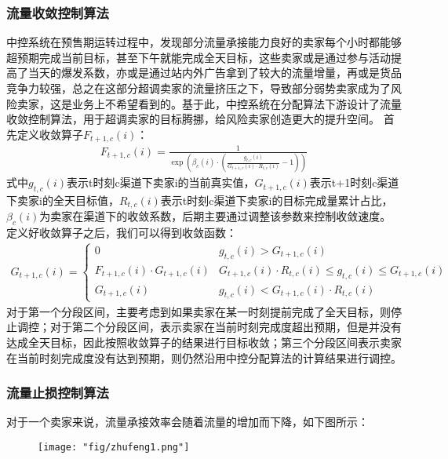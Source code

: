 \subsubsection{流量收敛控制算法}
中控系统在预售期运转过程中，发现部分流量承接能力良好的卖家每个小时都能够超预期完成当前目标，甚至下午就能完成全天目标，这些卖家或是通过参与活动提高了当天的爆发系数，亦或是通过站内外广告拿到了较大的流量增量，再或是货品竞争力较强，总之在这部分超调卖家的流量挤压之下，导致部分弱势卖家成为了风险卖家，这是业务上不希望看到的。基于此，中控系统在分配算法下游设计了流量收敛控制算法，用于超调卖家的目标腾挪，给风险卖家创造更大的提升空间。
首先定义收敛算子$F_{t+1,c}(i)$：
\begin{align}
F_{t+1,c}(i) = \frac{1}{\exp\left(\beta_c(i) \cdot (\frac{g_{t,c}(i)}{G_{t+1,c}(i) \cdot R_{t,c}(i)} - 1)\right )}
\end{align}
式中$g_{t,c}(i)$表示t时刻c渠道下卖家i的当前真实值，$G_{t+1,c}(i)$表示t+1时刻c渠道下卖家i的全天目标值，$R_{t,c}(i)$表示t时刻c渠道下卖家i的目标完成量累计占比，$\beta_c(i)$为卖家在渠道下的收敛系数，后期主要通过调整该参数来控制收敛速度。
定义好收敛算子之后，我们可以得到收敛函数：
\begin{align}
G_{t+1,c}(i)= \begin{cases}  
0 & g_{t,c}(i)>G_{t+1,c}(i) \\
F_{t+1,c}(i) \cdot G_{t+1,c}(i) & G_{t+1,c}(i)\cdot R_{t,c}(i) \leq g_{t,c}(i) \leq G_{t+1,c}(i) \\
G_{t+1,c}(i) & g_{t,c}(i)<G_{t+1,c}(i) \cdot R_{t,c}(i)
\end{cases}
\end{align}
对于第一个分段区间，主要考虑到如果卖家在某一时刻提前完成了全天目标，则停止调控；对于第二个分段区间，表示卖家在当前时刻完成度超出预期，但是并没有达成全天目标，因此按照收敛算子的结果进行目标收敛；第三个分段区间表示卖家在当前时刻完成度没有达到预期，则仍然沿用中控分配算法的计算结果进行调控。


\subsubsection{流量止损控制算法}
对于一个卖家来说，流量承接效率会随着流量的增加而下降，如下图所示：

\begin{figure}[!h]
	\centering
	\texttt{[image: "fig/zhufeng1.png"]}
	\caption{}
	\label{fig:zhufeng1}
\end{figure}

